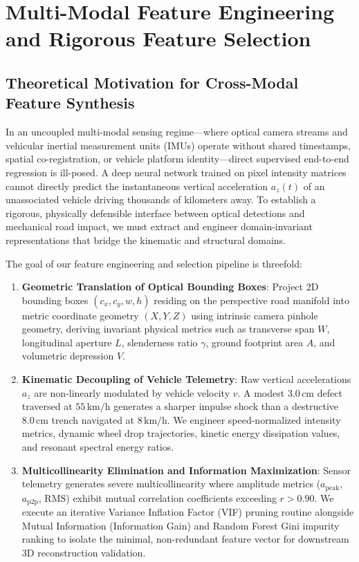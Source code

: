 \section{Multi-Modal Feature Engineering and Rigorous Feature Selection}
\label{sec:feature_engineering_and_selection}

\subsection{Theoretical Motivation for Cross-Modal Feature Synthesis}
In an uncoupled multi-modal sensing regime---where optical camera streams and vehicular inertial measurement units (IMUs) operate without shared timestamps, spatial co-registration, or vehicle platform identity---direct supervised end-to-end regression is ill-posed. A deep neural network trained on pixel intensity matrices cannot directly predict the instantaneous vertical acceleration $a_z(t)$ of an unassociated vehicle driving thousands of kilometers away. To establish a rigorous, physically defensible interface between optical detections and mechanical road impact, we must extract and engineer domain-invariant representations that bridge the kinematic and structural domains.

The goal of our feature engineering and selection pipeline is threefold:
\begin{enumerate}
    \item \textbf{Geometric Translation of Optical Bounding Boxes}: Project 2D bounding boxes $(c_x, c_y, w, h)$ residing on the perspective road manifold into metric coordinate geometry $(X, Y, Z)$ using intrinsic camera pinhole geometry, deriving invariant physical metrics such as transverse span $W$, longitudinal aperture $L$, slenderness ratio $\gamma$, ground footprint area $A$, and volumetric depression $V$.
    \item \textbf{Kinematic Decoupling of Vehicle Telemetry}: Raw vertical accelerations $a_z$ are non-linearly modulated by vehicle velocity $v$. A modest $3.0\,\text{cm}$ defect traversed at $55\,\text{km/h}$ generates a sharper impulse shock than a destructive $8.0\,\text{cm}$ trench navigated at $8\,\text{km/h}$. We engineer speed-normalized intensity metrics, dynamic wheel drop trajectories, kinetic energy dissipation values, and resonant spectral energy ratios.
    \item \textbf{Multicollinearity Elimination and Information Maximization}: Sensor telemetry generates severe multicollinearity where amplitude metrics ($a_{\text{peak}}$, $a_{\text{p2p}}$, $\text{RMS}$) exhibit mutual correlation coefficients exceeding $r > 0.90$. We execute an iterative Variance Inflation Factor (VIF) pruning routine alongside Mutual Information (Information Gain) and Random Forest Gini impurity ranking to isolate the minimal, non-redundant feature vector for downstream 3D reconstruction validation.
\end{enumerate}

